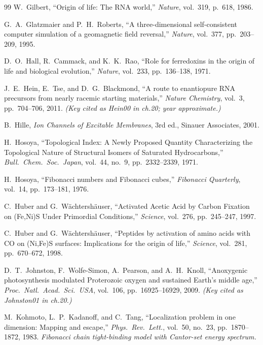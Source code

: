 \begin{thebibliography}{99}
W.~Gilbert,
``Origin of life: The RNA world,''
\emph{Nature}, vol.~319, p.~618, 1986.

G.~A.~Glatzmaier and P.~H.~Roberts,
``A three-dimensional self-consistent computer simulation of a geomagnetic field reversal,''
\emph{Nature}, vol.~377, pp.~203--209, 1995.

D.~O.~Hall, R.~Cammack, and K.~K.~Rao,
``Role for ferredoxins in the origin of life and biological evolution,''
\emph{Nature}, vol.~233, pp.~136--138, 1971.

J.~E.~Hein, E.~Tse, and D.~G.~Blackmond,
``A route to enantiopure RNA precursors from nearly racemic starting materials,''
\emph{Nature Chemistry}, vol.~3, pp.~704--706, 2011.
\textit{(Key cited as Hein00 in ch.20; year approximate.)}

B.~Hille,
\emph{Ion Channels of Excitable Membranes},
3rd ed., Sinauer Associates, 2001.

H.~Hosoya,
``Topological Index: A Newly Proposed Quantity Characterizing the Topological Nature of Structural Isomers of Saturated Hydrocarbons,''
\emph{Bull.\ Chem.\ Soc.\ Japan}, vol.~44, no.~9, pp.~2332--2339, 1971.

H.~Hosoya,
``Fibonacci numbers and Fibonacci cubes,''
\emph{Fibonacci Quarterly}, vol.~14, pp.~173--181, 1976.

C.~Huber and G.~W\"achtersh\"auser,
``Activated Acetic Acid by Carbon Fixation on (Fe,Ni)S Under Primordial Conditions,''
\emph{Science}, vol.~276, pp.~245--247, 1997.

C.~Huber and G.~W\"achtersh\"auser,
``Peptides by activation of amino acids with CO on (Ni,Fe)S surfaces:
Implications for the origin of life,''
\emph{Science}, vol.~281, pp.~670--672, 1998.

D.~T.~Johnston, F.~Wolfe-Simon, A.~Pearson, and A.~H.~Knoll,
``Anoxygenic photosynthesis modulated Proterozoic oxygen and sustained Earth's middle age,''
\emph{Proc.\ Natl.\ Acad.\ Sci.\ USA}, vol.~106, pp.~16925--16929, 2009.
\textit{(Key cited as Johnston01 in ch.20.)}

M.~Kohmoto, L.~P.~Kadanoff, and C.~Tang,
``Localization problem in one dimension: Mapping and escape,''
\emph{Phys.\ Rev.\ Lett.}, vol.~50, no.~23, pp.~1870--1872, 1983.
\textit{Fibonacci chain tight-binding model with Cantor-set energy spectrum.}


\end{thebibliography}
